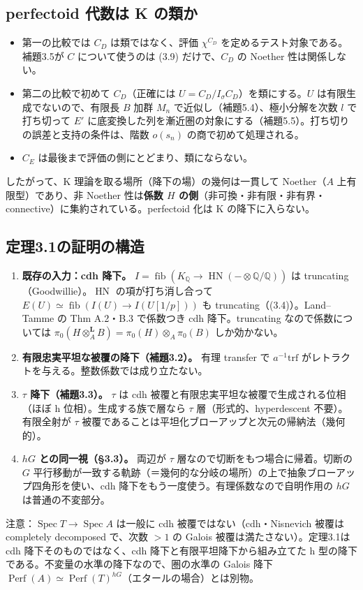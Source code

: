 \documentclass[11pt,a4paper]{ltjsarticle}
\theoremstyle{plain}
\theoremstyle{definition}
\theoremstyle{remark}
\newcommand{\Q}{\mathbb{Q}}
\newcommand{\Perf}{\operatorname{Perf}}
\newcommand{\fib}{\operatorname{fib}}
\newcommand{\Lotimes}{\otimes^{\mathbf{L}}}
\begin{document}
\subsection{perfectoid 代数は K の類か}
\begin{itemize}
  \item 第一の比較では $C_D$ は類ではなく、評価 $\chi^{C_D}$ を定めるテスト対象である。補題3.5が $C$ について使うのは (3.9) だけで、$C_D$ の Noether 性は関係しない。
  \item 第二の比較で初めて $C_D$（正確には $U=C_D/I_\sigma C_D$）を類にする。$U$ は有限生成でないので、有限長 $B$ 加群 $M_n$ で近似し（補題5.4）、極小分解を次数 $l$ で打ち切って $E'$ に底変換した列を漸近圏の対象にする（補題5.5）。打ち切りの誤差と支持の条件は、階数 $o(s_n)$ の商で初めて処理される。
  \item $C_E$ は最後まで評価の側にとどまり、類にならない。
\end{itemize}
したがって、K 理論を取る場所（降下の場）の幾何は一貫して Noether（$A$ 上有限型）であり、非 Noether 性は\textbf{係数 $H$ の側}（非可換・非有限・非有界・connective）に集約されている。perfectoid 化は K の降下に入らない。

\subsection{定理3.1の証明の構造}
\begin{enumerate}[label=(\arabic*)]
  \item \textbf{既存の入力：cdh 降下。} $I=\fib(K_\Q\to\operatorname{HN}(-\otimes\Q/\Q))$ は truncating（Goodwillie）。$\operatorname{HN}$ の項が打ち消し合って $E(U)\simeq\fib(I(U)\to I(U[1/p]))$ も truncating（(3.4)）。Land--Tamme の Thm A.2・B.3 で係数つき cdh 降下。truncating なので係数については $\pi_0(H\Lotimes_A B)=\pi_0(H)\otimes_A\pi_0(B)$ しか効かない。
  \item \textbf{有限忠実平坦な被覆の降下（補題3.2）。} 有理 transfer で $a^{-1}\mathrm{trf}$ がレトラクトを与える。整数係数では成り立たない。
  \item \textbf{$\tau$ 降下（補題3.3）。} $\tau$ は cdh 被覆と有限忠実平坦な被覆で生成される位相（ほぼ h 位相）。生成する族で層なら $\tau$ 層（形式的、hyperdescent 不要）。有限全射が $\tau$ 被覆であることは平坦化ブローアップと次元の帰納法（幾何的）。
  \item \textbf{$hG$ との同一視（§3.3）。} 両辺が $\tau$ 層なので切断をもつ場合に帰着。切断の $G$ 平行移動が一致する軌跡（＝幾何的な分岐の場所）の上で抽象ブローアップ四角形を使い、cdh 降下をもう一度使う。有理係数なので自明作用の $hG$ は普通の不変部分。
\end{enumerate}
注意：$\operatorname{Spec}T\to\operatorname{Spec}A$ は一般に cdh 被覆ではない（cdh・Nisnevich 被覆は completely decomposed で、次数 $>1$ の Galois 被覆は満たさない）。定理3.1は cdh 降下そのものではなく、cdh 降下と有限平坦降下から組み立てた h 型の降下である。不変量の水準の降下なので、圏の水準の Galois 降下 $\Perf(A)\simeq\Perf(T)^{hG}$（エタールの場合）とは別物。
\end{document}

